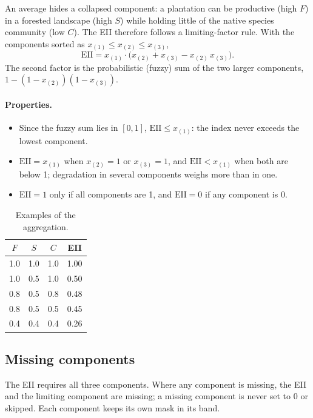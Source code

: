 \documentclass[11pt,a4paper]{article}
\newcommand{\EII}{\mathrm{EII}}
\begin{document}
An average hides a collapsed component: a plantation can be productive (high $F$) in a forested
landscape (high $S$) while holding little of the native species community (low $C$). The EII
therefore follows a limiting-factor rule. With the components sorted as
$x_{(1)} \le x_{(2)} \le x_{(3)}$,
\begin{equation}
\EII = x_{(1)} \cdot \bigl(x_{(2)} + x_{(3)} - x_{(2)}\,x_{(3)}\bigr).
\end{equation}
The second factor is the probabilistic (fuzzy) sum of the two larger components,
$1 - (1 - x_{(2)})(1 - x_{(3)})$.

\paragraph{Properties.}
\begin{itemize}
\item Since the fuzzy sum lies in $[0,1]$, $\EII \le x_{(1)}$: the index never exceeds the lowest
component.
\item $\EII = x_{(1)}$ when $x_{(2)} = 1$ or $x_{(3)} = 1$, and $\EII < x_{(1)}$ when both are below
1; degradation in several components weighs more than in one.
\item $\EII = 1$ only if all components are 1, and $\EII = 0$ if any component is 0.
\end{itemize}

\begin{table}[H]
\centering\small
\caption{Examples of the aggregation.}
\begin{tabular}{ccc|c}
\toprule
$F$ & $S$ & $C$ & EII \\
\midrule
1.0 & 1.0 & 1.0 & 1.00 \\
1.0 & 0.5 & 1.0 & 0.50 \\
0.8 & 0.5 & 0.8 & 0.48 \\
0.8 & 0.5 & 0.5 & 0.45 \\
0.4 & 0.4 & 0.4 & 0.26 \\
\bottomrule
\end{tabular}
\end{table}

\subsection{Missing components}

The EII requires all three components. Where any component is missing, the EII and the limiting
component are missing; a missing component is never set to 0 or skipped. Each component keeps
its own mask in its band.
\end{document}
